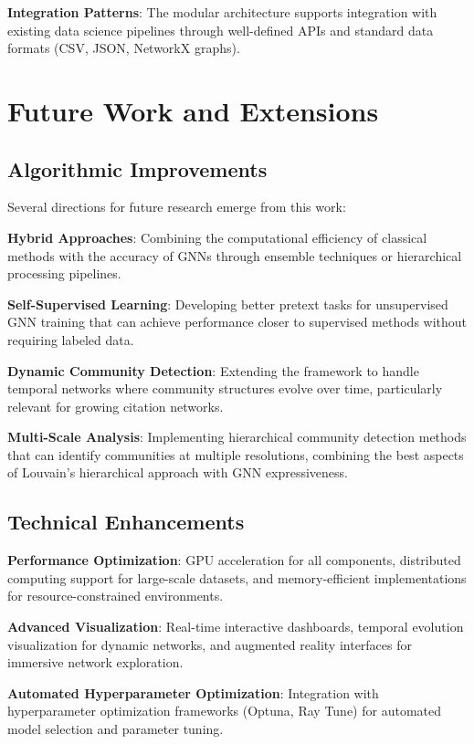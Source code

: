 \documentclass[conference]{IEEEtran}
\begin{document}
\textbf{Integration Patterns}: The modular architecture supports integration with existing data science pipelines through well-defined APIs and standard data formats (CSV, JSON, NetworkX graphs).

\section{Future Work and Extensions}

\subsection{Algorithmic Improvements}

Several directions for future research emerge from this work:

\textbf{Hybrid Approaches}: Combining the computational efficiency of classical methods with the accuracy of GNNs through ensemble techniques or hierarchical processing pipelines.

\textbf{Self-Supervised Learning}: Developing better pretext tasks for unsupervised GNN training that can achieve performance closer to supervised methods without requiring labeled data.

\textbf{Dynamic Community Detection}: Extending the framework to handle temporal networks where community structures evolve over time, particularly relevant for growing citation networks.

\textbf{Multi-Scale Analysis}: Implementing hierarchical community detection methods that can identify communities at multiple resolutions, combining the best aspects of Louvain's hierarchical approach with GNN expressiveness.

\subsection{Technical Enhancements}

\textbf{Performance Optimization}: GPU acceleration for all components, distributed computing support for large-scale datasets, and memory-efficient implementations for resource-constrained environments.

\textbf{Advanced Visualization}: Real-time interactive dashboards, temporal evolution visualization for dynamic networks, and augmented reality interfaces for immersive network exploration.

\textbf{Automated Hyperparameter Optimization}: Integration with hyperparameter optimization frameworks (Optuna, Ray Tune) for automated model selection and parameter tuning.
\end{document}
